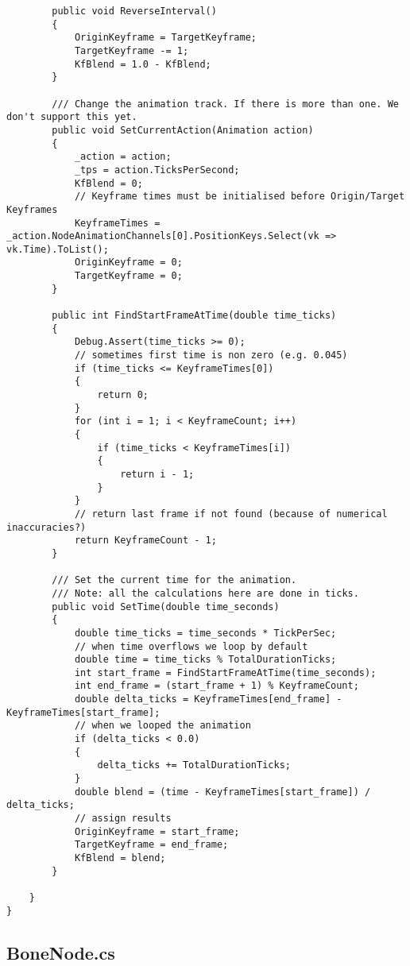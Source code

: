 \begin{scriptsize}
\begin{verbatim}
        public void ReverseInterval()
        {
            OriginKeyframe = TargetKeyframe;
            TargetKeyframe -= 1;
            KfBlend = 1.0 - KfBlend;
        }

        /// Change the animation track. If there is more than one. We don't support this yet.
        public void SetCurrentAction(Animation action)
        {
            _action = action;
            _tps = action.TicksPerSecond;
            KfBlend = 0; 
            // Keyframe times must be initialised before Origin/Target Keyframes
            KeyframeTimes = _action.NodeAnimationChannels[0].PositionKeys.Select(vk => vk.Time).ToList();
            OriginKeyframe = 0;
            TargetKeyframe = 0;
        }

        public int FindStartFrameAtTime(double time_ticks)
        {
            Debug.Assert(time_ticks >= 0);
            // sometimes first time is non zero (e.g. 0.045)
            if (time_ticks <= KeyframeTimes[0])
            {
                return 0;
            }
            for (int i = 1; i < KeyframeCount; i++)
            {
                if (time_ticks < KeyframeTimes[i])
                {
                    return i - 1;
                }
            }
            // return last frame if not found (because of numerical inaccuracies?)
            return KeyframeCount - 1;
        }

        /// Set the current time for the animation.
        /// Note: all the calculations here are done in ticks.
        public void SetTime(double time_seconds)
        {            
            double time_ticks = time_seconds * TickPerSec;
            // when time overflows we loop by default
            double time = time_ticks % TotalDurationTicks;
            int start_frame = FindStartFrameAtTime(time_seconds);
            int end_frame = (start_frame + 1) % KeyframeCount;
            double delta_ticks = KeyframeTimes[end_frame] - KeyframeTimes[start_frame];
            // when we looped the animation
            if (delta_ticks < 0.0)
            {
                delta_ticks += TotalDurationTicks;
            }
            double blend = (time - KeyframeTimes[start_frame]) / delta_ticks;
            // assign results
            OriginKeyframe = start_frame;
            TargetKeyframe = end_frame;
            KfBlend = blend;
        }

    }
}

\end{verbatim}

\subsection{BoneNode.cs}


\end{scriptsize}
